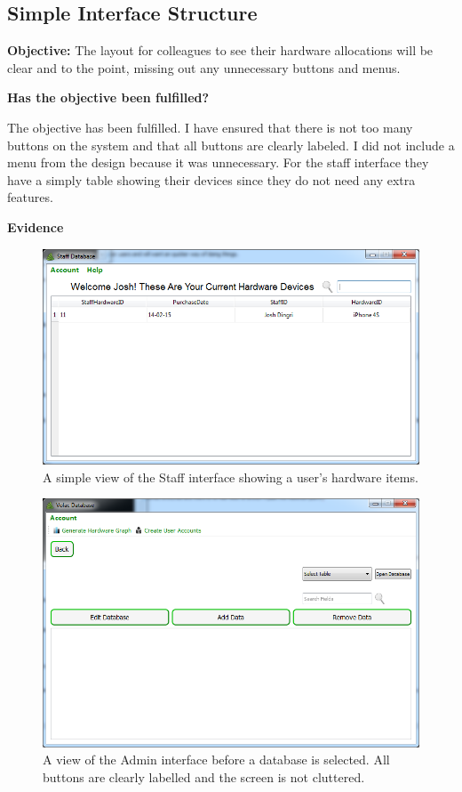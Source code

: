 \subsection{Simple Interface Structure}\label{interface}

\textbf{Objective:} The layout for colleagues to see their hardware allocations will be clear and to the point, missing out any unnecessary buttons and menus.

\textbf{Has the objective been fulfilled?}

The objective has been fulfilled. I have ensured that there is not too many buttons on the system and that all buttons are clearly labeled. I did not include a menu from the design because it was unnecessary. For the staff interface they have a simply table showing their devices  since they do not need any extra features. 

\textbf{Evidence}

\begin{figure}[H]
    \includegraphics[width=\textwidth]{./Evaluation/Images/staffhardwaredevice.png}
    \caption{A simple view of the Staff interface showing a user's hardware items.} 
\end{figure}

\begin{figure}[H]
    \includegraphics[width=\textwidth]{./Evaluation/Images/clearlabels.png}
    \caption{A view of the Admin interface before a database is selected. All buttons are clearly labelled and the screen is not cluttered.} 
\end{figure}


